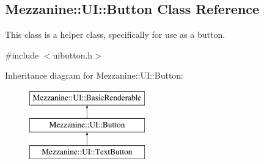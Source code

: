 \hypertarget{classMezzanine_1_1UI_1_1Button}{
\subsection{Mezzanine::UI::Button Class Reference}
\label{classMezzanine_1_1UI_1_1Button}
}


This class is a helper class, specifically for use as a button.  




{\ttfamily \#include $<$uibutton.h$>$}

Inheritance diagram for Mezzanine::UI::Button:\begin{figure}[H]
\begin{center}
\leavevmode
\includegraphics[height=3.000000cm]{classMezzanine_1_1UI_1_1Button}
\end{center}
\end{figure}
